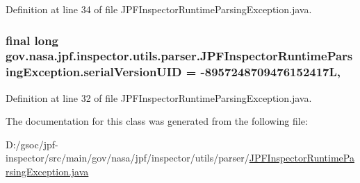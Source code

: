 Definition at line 34 of file J\+P\+F\+Inspector\+Runtime\+Parsing\+Exception.\+java.

\subsubsection[{\texorpdfstring{serial\+Version\+U\+ID}{serialVersionUID}}]{\setlength{\rightskip}{0pt plus 5cm}final long gov.\+nasa.\+jpf.\+inspector.\+utils.\+parser.\+J\+P\+F\+Inspector\+Runtime\+Parsing\+Exception.\+serial\+Version\+U\+ID = -\/8957248709476152417L\hspace{0.3cm}{\ttfamily [static]}, {\ttfamily [private]}}\hypertarget{classgov_1_1nasa_1_1jpf_1_1inspector_1_1utils_1_1parser_1_1_j_p_f_inspector_runtime_parsing_exception_a1da637d80b18f37c886632e86799b1b4}{}\label{classgov_1_1nasa_1_1jpf_1_1inspector_1_1utils_1_1parser_1_1_j_p_f_inspector_runtime_parsing_exception_a1da637d80b18f37c886632e86799b1b4}


Definition at line 32 of file J\+P\+F\+Inspector\+Runtime\+Parsing\+Exception.\+java.



The documentation for this class was generated from the following file\+:\begin{DoxyCompactItemize}
\item 
D\+:/gsoc/jpf-\/inspector/src/main/gov/nasa/jpf/inspector/utils/parser/\hyperlink{_j_p_f_inspector_runtime_parsing_exception_8java}{J\+P\+F\+Inspector\+Runtime\+Parsing\+Exception.\+java}\end{DoxyCompactItemize}
